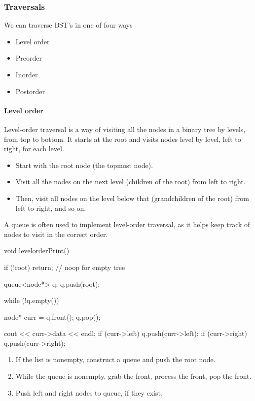 \documentclass{report}
\begin{document}
\pagebreak 
\subsubsection{Traversals}
\bigbreak \noindent 
We can traverse BST's in one of four ways
\begin{itemize}
    \item Level order
    \item Preorder
    \item Inorder
    \item Postorder
\end{itemize}
\bigbreak \noindent 
\paragraph{Level order}
\bigbreak \noindent \bigbreak \noindent 
Level-order traversal is a way of visiting all the nodes in a binary tree by levels, from top to bottom. It starts at the root and visits nodes level by level, left to right, for each level.
\begin{itemize}
    \item Start with the root node (the topmost node).
    \item Visit all the nodes on the next level (children of the root) from left to right.
    \item Then, visit all nodes on the level below that (grandchildren of the root) from left to right, and so on.
\end{itemize}
A queue is often used to implement level-order traversal, as it helps keep track of nodes to visit in the correct order.
\bigbreak \noindent 
\begin{cppcode}
    void levelorderPrint() {
        if (!root) return; // noop for empty tree

        queue<node*> q;
        q.push(root);

        while (!q.empty()) {
            node* curr = q.front();
            q.pop();

            cout << curr->data << endl;
            if (curr->left) {
                q.push(curr->left);
            }
            if (curr->right) {
                q.push(curr->right);
            }
        }
    }
\end{cppcode}
\begin{enumerate}
    \item If the list is nonempty, construct a queue and push the root node.
    \item While the queue is nonempty, grab the front, process the front, pop the front.
    \item Push left and right nodes to queue, if they exist.
\end{enumerate}
\end{document}
